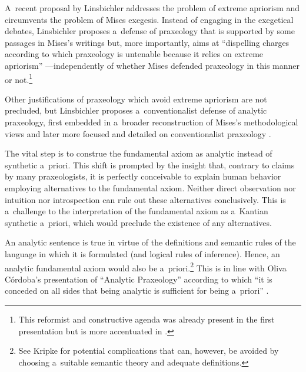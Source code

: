 A~recent proposal by Linsbichler 
\parencites[][]{linsbichler_was_2017}[][]{linsbichler_austrian_2021} %
 addresses the problem of extreme apriorism and circumvents the problem of Mises exegesis. Instead of engaging in the exegetical debates, Linsbichler proposes a~defense of praxeology that is supported by some passages in Mises's writings but, more importantly, aims at ``dispelling charges according to which praxeology is untenable because it relies on extreme apriorism'' 
\parencite[][p.204]{linsbichler_otto_2021}%
---independently of whether Mises defended praxeology in this manner or not.\footnote{This reformist and constructive agenda was already present in the first presentation 
\parencite[][see e~.g. p.124]{linsbichler_was_2017} %
 but is more accentuated in 
\parencites[][]{linsbichler_austrian_2021}[][]{linsbichler_otto_2021}.%
}



Other justifications of praxeology which avoid extreme apriorism are not precluded, but Linsbichler 
\parencite*[][]{linsbichler_was_2017} %
 proposes a~conventionalist defense of analytic praxeology, first embedded in a~broader reconstruction of Mises's methodological views and later more focused and detailed on conventionalist praxeology 
\parencite[][]{linsbichler_austrian_2021}.%




The vital step is to construe the fundamental axiom as analytic instead of synthetic a~priori. This shift is prompted by the insight that, contrary to claims by many praxeologists, it is perfectly conceivable to explain human behavior employing alternatives to the fundamental axiom. Neither direct observation nor intuition nor introspection can rule out these alternatives conclusively. This is a~challenge to the interpretation of the fundamental axiom as a~Kantian synthetic a~priori, which would preclude the existence of any alternatives.



An analytic sentence is true in virtue of the definitions and semantic rules of the language in which it is formulated (and logical rules of inference). Hence, an analytic fundamental axiom would also be a~priori.\footnote{See Kripke 
\parencites[][]{kripke_naming_1972}[][pp.122–123]{kripke_naming_1980} %
 for potential complications that can, however, be avoided by choosing a~suitable semantic theory and adequate definitions. } This is in line with Oliva Córdoba's presentation of ``Analytic Praxeology'' according to which ``it is conceded on all sides that being analytic is sufficient for being a~priori'' 
\parencites[][p.528]{oliva_cordoba_uneasiness_2017}[see also 523,][]{}.%




